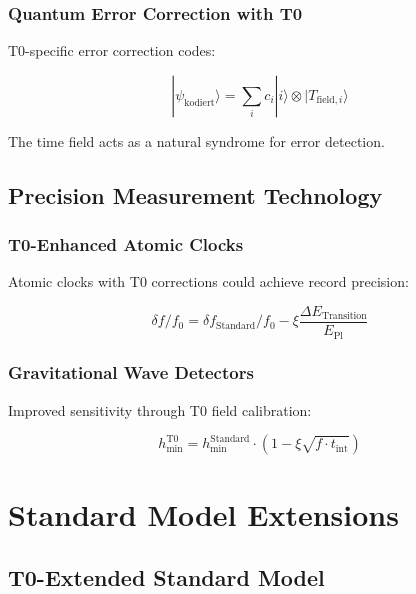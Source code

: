 \documentclass[12pt,a4paper]{article}
\newcommand{\xipar}{\xi}
\newcommand{\EPlanck}{E_{\text{Pl}}}
\begin{document}
	\subsubsection{Quantum Error Correction with T0}
	
	T0-specific error correction codes:
	
	\begin{equation}
		|\psi_{\text{kodiert}}\rangle = \sum_i c_i |i\rangle \otimes |T_{\text{field},i}\rangle
	\end{equation}
	
	The time field acts as a natural syndrome for error detection.
	
	\subsection{Precision Measurement Technology}
	
	\subsubsection{T0-Enhanced Atomic Clocks}
	
	Atomic clocks with T0 corrections could achieve record precision:
	
	\begin{equation}
		\delta f / f_0 = \delta f_{\text{Standard}} / f_0 - \xipar \frac{\Delta E_{\text{Transition}}}{\EPlanck}
	\end{equation}
	
	\subsubsection{Gravitational Wave Detectors}
	
	Improved sensitivity through T0 field calibration:
	
	\begin{equation}
		h_{\text{min}}^{\text{T0}} = h_{\text{min}}^{\text{Standard}} \cdot \left(1 - \xipar \sqrt{f \cdot t_{\text{int}}}\right)
	\end{equation}
	
	\section{Standard Model Extensions}
	
	\subsection{T0-Extended Standard Model}
	
\end{document}
